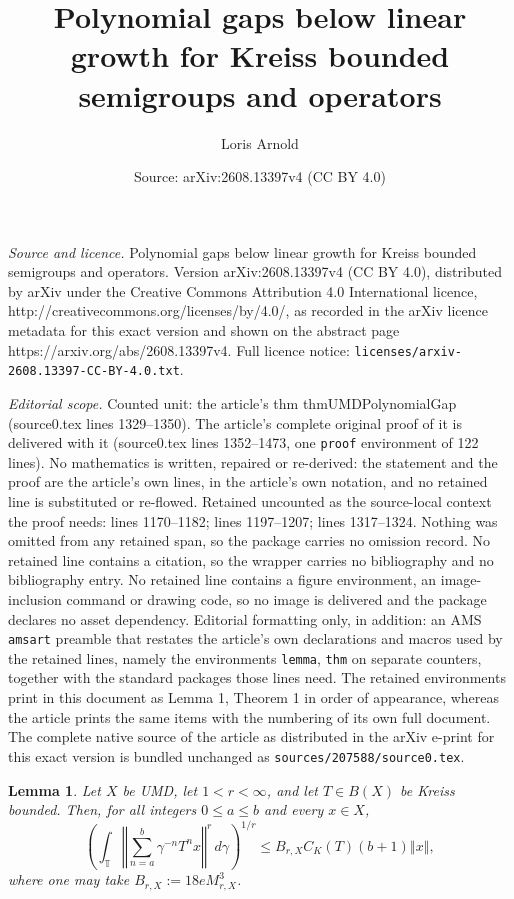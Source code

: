 \documentclass[10pt,a4paper]{amsart}
\title{Polynomial gaps below linear growth for Kreiss bounded semigroups and operators}
\author{Loris Arnold}
\date{Source: arXiv:2608.13397v4 (CC BY 4.0)}
\newtheorem{lemma}{Lemma}
\newcommand{\T}{\mathbb{T}}
\newcommand{\norm}[1]{\left\Vert #1\right\Vert}
\begin{document}
\maketitle

\noindent\emph{Source and licence.} Polynomial gaps below linear growth for Kreiss bounded semigroups and operators. Version arXiv:2608.13397v4 (CC BY 4.0), distributed by arXiv under the Creative Commons Attribution 4.0 International licence, http://creativecommons.org/licenses/by/4.0/, as recorded in the arXiv licence metadata for this exact version and shown on the abstract page https://arxiv.org/abs/2608.13397v4. Full licence notice: \texttt{licenses/arxiv-2608.13397-CC-BY-4.0.txt}.\par\smallskip

\noindent\textit{Editorial scope.} Counted unit: the article's thm thmUMDPolynomialGap (source0.tex lines 1329--1350). The article's complete original proof of it is delivered with it (source0.tex lines 1352--1473, one \texttt{proof} environment of 122 lines). No mathematics is written, repaired or re-derived: the statement and the proof are the article's own lines, in the article's own notation, and no retained line is substituted or re-flowed.  Retained uncounted as the source-local context the proof needs: lines 1170--1182; lines 1197--1207; lines 1317--1324.  Nothing was omitted from any retained span, so the package carries no omission record.  No retained line contains a citation, so the wrapper carries no bibliography and no bibliography entry.  No retained line contains a figure environment, an image-inclusion command or drawing code, so no image is delivered and the package declares no asset dependency.  Editorial formatting only, in addition: an AMS \texttt{amsart} preamble that restates the article's own declarations and macros used by the retained lines, namely the environments \texttt{lemma}, \texttt{thm} on separate counters, together with the standard packages those lines need.  The retained environments print in this document as Lemma 1, Theorem 1 in order of appearance, whereas the article prints the same items with the numbering of its own full document.  The complete native source of the article as distributed in the arXiv e-print for this exact version is bundled unchanged as \texttt{sources/207588/source0.tex}.
	\begin{lemma}\label{lemCunyBlock}
		Let $X$ be UMD, let $1<r<\infty$, and let $T\in B(X)$ be Kreiss bounded.
		Then, for all integers $0\le a\le b$ and every $x\in X$,
		\begin{equation}\label{eqCunyBlock}
			\left(
			\int_{\T}
			\norm{\sum_{n=a}^b\gamma^{-n}T^nx}^r\,d\gamma
			\right)^{1/r}
			\le
			B_{r,X}C_K(T)(b+1)\norm{x},
		\end{equation}
		where one may take $B_{r,X}:=18eM_{r,X}^3$.
	\end{lemma}
\end{document}
